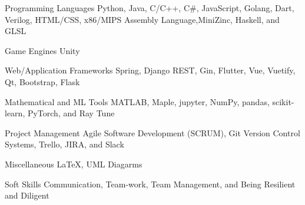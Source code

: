 

\begin{cvskills}

  \cvskill
    {Programming Languages} %
    {Python, Java, C/C++, C\#, JavaScript, Golang, Dart, Verilog, HTML/CSS, x86/MIPS Assembly Language,\newline MiniZinc, Haskell, and GLSL} %

  \cvskill
    {Game Engines} %
    {Unity} %

  \ifbool{FullVersion}{
    \cvskill
        {GPU Programming Frameworks} %
        {CUDA and OpenACC} %
    
    \cvskill
        {Graphics Libraries} %
        {OpenGL, GLUT, GLFW, GLEW, and SDL} %
  }{    
   \cvskill
    {Graphics and GPU Libraries} %
    {OpenGL, GLUT, GLFW, GLEW, SDL, and CUDA} %
  }




        

  \cvskill
    {Web/Application Frameworks} %
    {Spring, Django REST, Gin, Flutter, Vue, Vuetify, Qt, Bootstrap, Flask} %


  \cvskill
    {Mathematical and ML Tools} %
    {MATLAB, Maple, jupyter, NumPy, pandas, scikit-learn, PyTorch, and Ray Tune} %

  \cvskill
    {Project Management} %
    {Agile Software Development (SCRUM), Git Version Control Systems, Trello, JIRA, and Slack} %

  \cvskill
    {Miscellaneous} %
    {\LaTeX \space, UML Diagarms} %

  \cvskill
    {Soft Skills} %
    {Communication, Team-work, Team Management, and Being Resilient and Diligent} %

\end{cvskills}
